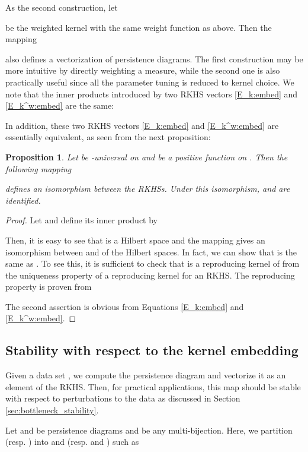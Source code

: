\documentclass{article}
\newtheorem{prop}[thm]{Proposition}
\begin{document}
As the second construction, let

be the weighted kernel with the same weight function as above.
Then the mapping 

also defines a vectorization of persistence diagrams.
The first construction may be more intuitive by directly weighting a measure, while the second one is also practically useful since all the parameter tuning is reduced to kernel choice.
We note that the inner products introduced by two RKHS vectors \eqref{E_k:embed} and \eqref{E_k^w:embed} are the same:

In addition, these two RKHS vectors \eqref{E_k:embed} and \eqref{E_k^w:embed} are essentially equivalent, as seen from the next proposition:

\begin{prop}\label{prop:iso}
Let  be -universal on  and  be a positive function on .
Then the following mapping

defines an isomorphism between the RKHSs.  Under this isomorphism,  and  are identified. 
\end{prop}

\begin{proof}
Let  and define its inner product by

Then, it is easy to see that  is a Hilbert space and the mapping  gives an isomorphism between  and  of the Hilbert spaces.
In fact, we can show that  is the same as .
To see this, it is sufficient to check that  is a reproducing kernel of  from the uniqueness property of a reproducing kernel for an RKHS.
The reproducing property is proven from 

The second assertion is obvious from Equations \eqref{E_k:embed} and \eqref{E_k^w:embed}.
\end{proof}

 

\subsection{Stability with respect to the kernel embedding}
\label{subsec:stability}

Given a data set , we compute the persistence diagram  and vectorize it as an element  of the RKHS.
Then, for practical applications, this map  should be stable with respect to perturbations to the data as discussed in Section \ref{sec:bottleneck_stability}. 

Let  and  be persistence diagrams and  be any multi-bijection. Here, we partition  (resp. ) into  and  (resp.  and ) such as 
\end{document}
